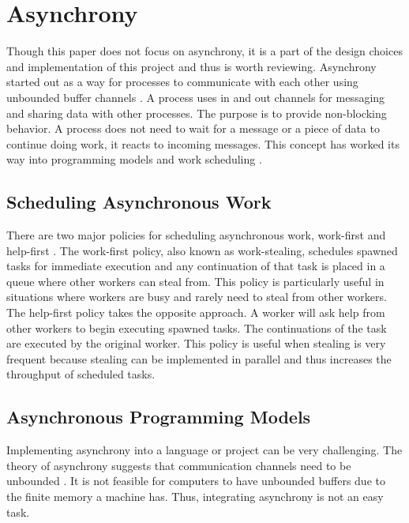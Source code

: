 \section{Asynchrony}

Though this paper does not focus on asynchrony, it is a part of the design choices and implementation of this project and thus is worth reviewing. Asynchrony started out as a way for processes to communicate with each other using unbounded buffer channels \cite{Josephs1989}. A process uses in and out channels for messaging and sharing data with other processes. The purpose is to provide non-blocking behavior. A process does not need to wait for a message or a piece of data to continue doing work, it reacts to incoming messages. This concept has worked its way into programming models and work scheduling \cite{Guo2009}\cite{Leijen2009}\cite{syme2011f}\cite{sutcliffe1988jackson}\cite{Cameron1986}\cite{Frigo1998}.

\subsection{Scheduling Asynchronous Work}

There are two major policies for scheduling asynchronous work, work-first and help-first \cite{Guo2009}. The work-first policy, also known as work-stealing, schedules spawned tasks for immediate execution and any continuation of that task is placed in a queue where other workers can steal from. This policy is particularly useful in situations where workers are busy and rarely need to steal from other workers. The help-first policy takes the opposite approach. A worker will ask help from other workers to begin executing spawned tasks. The continuations of the task are executed by the original worker. This policy is useful when stealing is very frequent because stealing can be implemented in parallel and thus increases the throughput of scheduled tasks.

\subsection{Asynchronous Programming Models}

Implementing asynchrony into a language or project can be very challenging. The theory of asynchrony suggests that communication channels need to be unbounded \cite{He1990}. It is not feasible for computers to have unbounded buffers due to the finite memory a machine has. Thus, integrating asynchrony is not an easy task.

